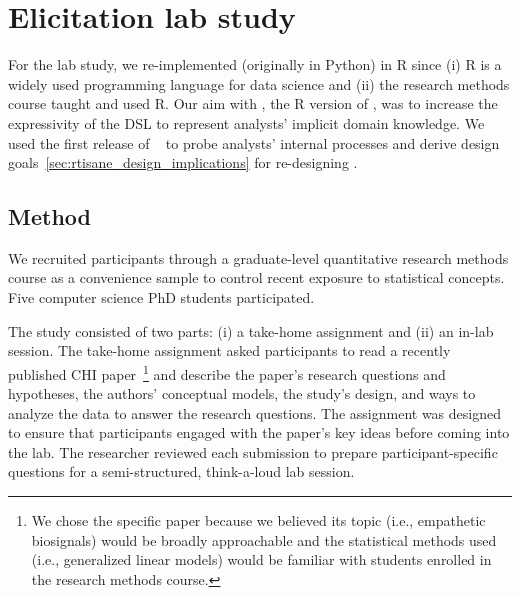\def\unit{\texttt{Unit}\xspace}
\def\measure{\texttt{Measure}\xspace}
\def\setup{\texttt{SetUp}\xspace}

\section{Elicitation lab study} \label{sec:exploratoryStudy}

For the lab study, we re-implemented \tisane (originally in Python) in R since
(i) R is a widely used programming language for data science and (ii) the
research methods course taught and used R. Our aim with \rTisane, the R version
of \tisane, was to increase the expressivity of the DSL to represent analysts'
implicit domain knowledge. We used the first release of
\tisane~\cite{jun2022tisane} to probe analysts' internal processes and derive
design goals~\autoref{sec:rtisane_design_implications} for re-designing \tisane.

\subsection{Method}
We recruited participants through a graduate-level quantitative research methods
course as a convenience sample to control recent exposure to
statistical concepts. Five computer science PhD students participated.

The study consisted of two parts: (i) a take-home assignment and (ii) an in-lab
session. The take-home assignment asked participants to read a recently
published CHI paper~\cite{winters2021heartbeat}\footnote{We chose the specific
paper because we believed its topic (i.e., empathetic biosignals) would be
broadly approachable and the statistical methods used (i.e., generalized linear
models) would be familiar with students enrolled in the research methods
course.} and describe the paper's research questions and hypotheses, the
authors' conceptual models, the study's design, and ways to analyze the data to
answer the research questions. The assignment was designed to ensure that
participants engaged with the paper's key ideas before coming into the lab. The
researcher reviewed each submission to prepare participant-specific questions
for a semi-structured, think-a-loud lab session. 

